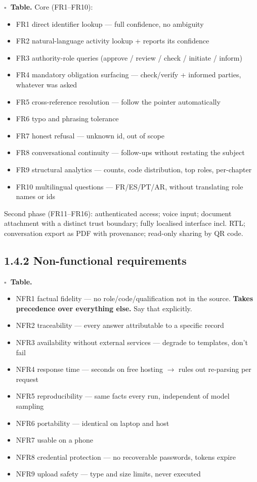 \documentclass[11pt,a4paper]{article}
\newcommand{\todo}{$\square$~}
\begin{document}
\textbf{\todo Table.} Core (FR1--FR10):
\begin{itemize}
\item FR1 direct identifier lookup --- full confidence, no ambiguity
\item FR2 natural-language activity lookup + reports its confidence
\item FR3 authority-role queries (approve / review / check / initiate / inform)
\item FR4 mandatory obligation surfacing --- check/verify + informed parties, whatever was asked
\item FR5 cross-reference resolution --- follow the pointer automatically
\item FR6 typo and phrasing tolerance
\item FR7 honest refusal --- unknown id, out of scope
\item FR8 conversational continuity --- follow-ups without restating the subject
\item FR9 structural analytics --- counts, code distribution, top roles, per-chapter
\item FR10 multilingual questions --- FR/ES/PT/AR, without translating role names or ids
\end{itemize}
Second phase (FR11--FR16): authenticated access; voice input; document attachment
with a distinct trust boundary; fully localised interface incl. RTL; conversation
export as PDF with provenance; read-only sharing by QR code.

\subsection*{1.4.2 Non-functional requirements}
\textbf{\todo Table.}
\begin{itemize}
\item NFR1 factual fidelity --- no role/code/qualification not in the source.
\textbf{Takes precedence over everything else.} Say that explicitly.
\item NFR2 traceability --- every answer attributable to a specific record
\item NFR3 availability without external services --- degrade to templates, don't fail
\item NFR4 response time --- seconds on free hosting $\rightarrow$ rules out re-parsing per request
\item NFR5 reproducibility --- same facts every run, independent of model sampling
\item NFR6 portability --- identical on laptop and host
\item NFR7 usable on a phone
\item NFR8 credential protection --- no recoverable passwords, tokens expire
\item NFR9 upload safety --- type and size limits, never executed
\end{itemize}
\end{document}
